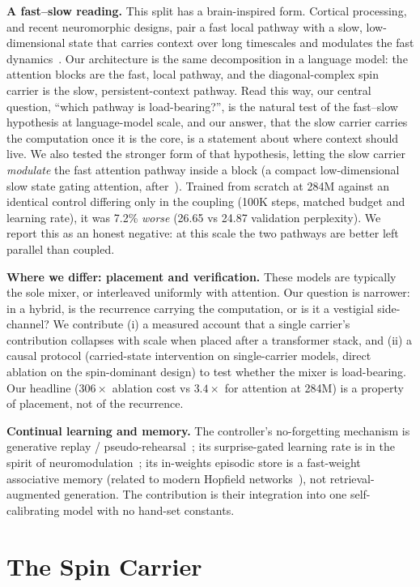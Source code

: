 \documentclass[10pt,twocolumn]{article}
\begin{document}
\textbf{A fast--slow reading.} This split has a brain-inspired form. Cortical processing, and recent neuromorphic designs, pair a fast local pathway with a slow, low-dimensional state that carries context over long timescales and modulates the fast dynamics~\cite{sun2026dualmemory}. Our architecture is the same decomposition in a language model: the attention blocks are the fast, local pathway, and the diagonal-complex spin carrier is the slow, persistent-context pathway. Read this way, our central question, ``which pathway is load-bearing?'', is the natural test of the fast--slow hypothesis at language-model scale, and our answer, that the slow carrier carries the computation once it is the core, is a statement about where context should live. We also tested the stronger form of that hypothesis, letting the slow carrier \emph{modulate} the fast attention pathway inside a block (a compact low-dimensional slow state gating attention, after~\cite{sun2026dualmemory}). Trained from scratch at 284M against an identical control differing only in the coupling (100K steps, matched budget and learning rate), it was 7.2\% \emph{worse} (26.65 vs 24.87 validation perplexity). We report this as an honest negative: at this scale the two pathways are better left parallel than coupled.

\textbf{Where we differ: placement and verification.} These models are typically the sole mixer, or interleaved uniformly with attention. Our question is narrower: in a hybrid, is the recurrence carrying the computation, or is it a vestigial side-channel? We contribute (i) a measured account that a single carrier's contribution collapses with scale when placed after a transformer stack, and (ii) a causal protocol (carried-state intervention on single-carrier models, direct ablation on the spin-dominant design) to test whether the mixer is load-bearing. Our headline ($306\times$ ablation cost vs $3.4\times$ for attention at 284M) is a property of placement, not of the recurrence.

\textbf{Continual learning and memory.} The controller's no-forgetting mechanism is generative replay / pseudo-rehearsal~\cite{robins1995}; its surprise-gated learning rate is in the spirit of neuromodulation~\cite{doya2002}; its in-weights episodic store is a fast-weight associative memory (related to modern Hopfield networks~\cite{ramsauer2021}), not retrieval-augmented generation. The contribution is their integration into one self-calibrating model with no hand-set constants.

\section{The Spin Carrier}
\label{sec:carrier}
\end{document}

